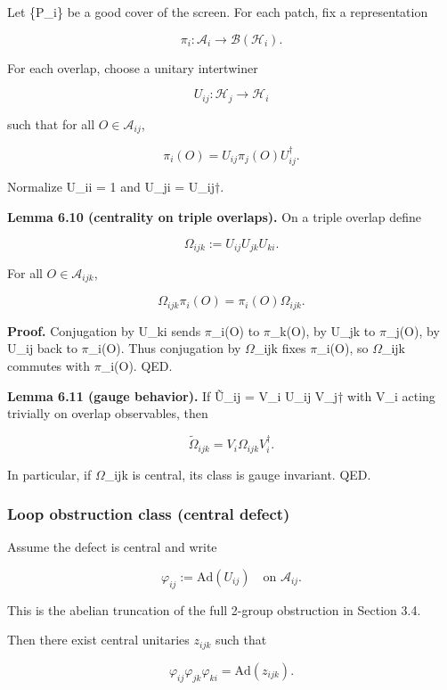 Let \{P\_i\} be a good cover of the screen. For each patch, fix a representation

\[
\pi_i: \mathcal{A}_i \to \mathcal B(\mathcal H_i).
\]

For each overlap, choose a unitary intertwiner

\[
U_{ij}: \mathcal H_j \to \mathcal H_i
\]

such that for all \(O \in \mathcal{A}_{ij}\),

\[
\pi_i(O) = U_{ij} \pi_j(O) U_{ij}^\dagger.
\]

Normalize U\_ii = 1 and U\_ji = U\_ij\ensuremath{\dagger}.

\textbf{Lemma 6.10 (centrality on triple overlaps).} On a triple overlap define

\[
\Omega_{ijk} := U_{ij} U_{jk} U_{ki}.
\]

For all \(O \in \mathcal{A}_{ijk}\),

\[
\Omega_{ijk} \pi_i(O) = \pi_i(O) \Omega_{ijk}.
\]

\textbf{Proof.} Conjugation by U\_ki sends \ensuremath{\pi}\_i(O) to \ensuremath{\pi}\_k(O), by U\_jk to \ensuremath{\pi}\_j(O), by U\_ij back to \ensuremath{\pi}\_i(O). Thus conjugation by \ensuremath{\Omega}\_ijk fixes \ensuremath{\pi}\_i(O), so \ensuremath{\Omega}\_ijk commutes with \ensuremath{\pi}\_i(O). QED.

\textbf{Lemma 6.11 (gauge behavior).} If \~{U}\_ij = V\_i U\_ij V\_j\ensuremath{\dagger} with V\_i acting trivially on overlap observables, then

\[
\tilde{\Omega}_{ijk} = V_i \Omega_{ijk} V_i^\dagger.
\]

In particular, if \ensuremath{\Omega}\_ijk is central, its class is gauge invariant. QED.

\subsubsection{Loop obstruction class (central defect)}\label{66-loop-obstruction-class-central-defect}

Assume the defect is central and write

\[
\varphi_{ij} := \mathrm{Ad}(U_{ij}) \quad \text{on } \mathcal{A}_{ij}.
\]

This is the abelian truncation of the full 2-group obstruction in Section 3.4.

Then there exist central unitaries \(z_{ijk}\) such that

\[
\varphi_{ij} \varphi_{jk} \varphi_{ki} = \mathrm{Ad}(z_{ijk}).
\]

